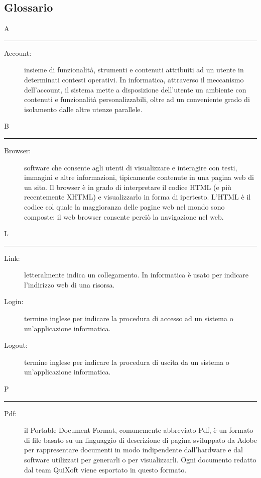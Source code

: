 \documentclass[11pt,a4paper]{article}
\begin{document}
\subsection{Glossario}
\flushleft \Huge A \bigskip
\hrule
\smallskip
\normalsize
\begin{description}
	\item[Account:] insieme di funzionalità, strumenti e contenuti attribuiti ad un utente in determinati contesti operativi. In informatica, attraverso il meccanismo dell'account, il sistema mette a disposizione dell'utente un ambiente con contenuti e funzionalità personalizzabili, oltre ad un conveniente grado di isolamento dalle altre utenze parallele.
\end{description}
\bigskip
\Huge B \bigskip
\hrule
\smallskip
\normalsize
\begin{description}
	\item[Browser:] software che consente agli utenti di visualizzare e interagire con testi, immagini e altre informazioni, tipicamente contenute in una pagina web di un sito. Il browser è in grado di interpretare il codice HTML (e più recentemente XHTML) e visualizzarlo in forma di ipertesto. L'HTML è il codice col quale la maggioranza delle pagine web nel mondo sono composte: il web browser consente perciò la navigazione nel web.
\end{description}
\bigskip
\Huge L \bigskip
\hrule
\smallskip
\normalsize
\begin{description}
	\item[Link:] letteralmente indica un collegamento. In informatica è usato per indicare l'indirizzo web di una risorsa.
	\item[Login:] termine inglese per indicare la procedura di accesso ad un sistema o un'applicazione informatica.
	\item[Logout:] termine inglese per indicare la procedura di uscita da un sistema o un'applicazione informatica.
\end{description}
\bigskip
\Huge P \bigskip
\hrule
\smallskip
\normalsize
\begin{description}
	\item[Pdf:] il Portable Document Format, comunemente abbreviato Pdf, è un formato di file basato su un linguaggio di descrizione di pagina sviluppato da Adobe per rappresentare documenti in modo indipendente dall'hardware e dal software utilizzati per generarli o per visualizzarli. Ogni documento redatto dal team QuiXoft viene esportato in questo formato.
\end{description}
\end{document}
